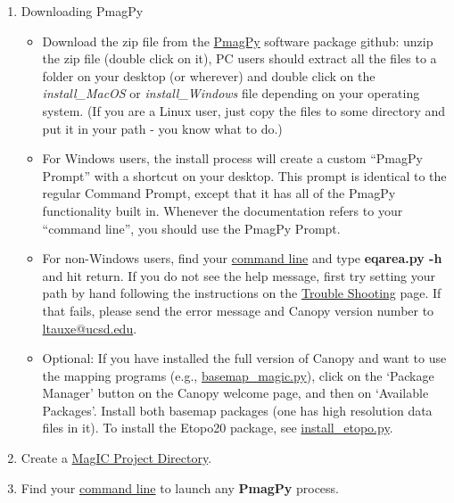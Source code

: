 \documentclass[11pt]{book}
\begin{document}
{\begin{enumerate}
\begin{itemize}
   \item If you run into problems with your installation, you may need to uninstall any previous Python installations.
   \end{itemize}
 \item Downloading PmagPy
   \begin{itemize}
   \item Download the zip file from the \href{https://github.com/ltauxe/PmagPy/releases/latest} {PmagPy} software package github: unzip the zip file (double click on it), PC users should extract all the files to a folder on your desktop (or wherever)  and double click on the {\it install\_MacOS} or {\it install\_Windows} file depending on your operating system.  (If you are a Linux user, just copy the files to some directory and put it in your path - you know what to do.)
   \item For Windows users, the install process will create a custom ``PmagPy Prompt'' with a shortcut on your desktop.  This prompt is identical to the regular Command Prompt, except that it has all of the PmagPy functionality built in. Whenever the documentation refers to your ``command line'', you should use the PmagPy Prompt.
   \item For non-Windows users, find your \href{#command_line}{command line} and type {\bf eqarea.py -h} and hit return.  If you do not see the help message, first try setting your path by hand following the instructions on the  \href{#trouble}{Trouble Shooting} page. If that fails, please send the error message and  Canopy version number to \href{mailto:ltauxe@ucsd.edu?subject=PmagPy Cookbook}{ltauxe@ucsd.edu}.
   \item Optional: If you have installed the full version of Canopy and want to use the mapping programs (e.g., \href{#basemap_magic.py}{basemap\_magic.py}), 
     click on  the `Package Manager' button on the Canopy welcome page, and then on `Available Packages'.  Install both basemap packages (one has high resolution data files in it).  To install the Etopo20 package, see \href{#install_etopo.py}{install\_etopo.py}.
   \end{itemize}

\item Create a \href{#Project_Directory}{MagIC Project Directory}.
\item Find your \href{#command_line}{command line} to launch any {\bf PmagPy} process.
\end{enumerate}

}
\end{document}
